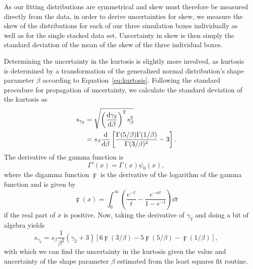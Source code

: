 As our fitting distributions are symmetrical and skew must therefore be measured directly from the data, in order to derive uncertainties for skew, we measure the skew of the distributions for each of our three simulation boxes individually as well as for the single stacked data set.  Uncertainty in skew is then simply the standard deviation of the mean of the skew of the three individual boxes.

Determining the uncertainty in the kurtosis is slightly more involved, as kurtosis is determined by a transformation of the generalized normal distribution's shape parameter $\beta$ according to Equation~\ref{eq:kurtosis}.  Following the standard procedure for propagation of uncertainty, we calculate the standard deviation of the kurtosis as
\begin{align} \label{eq:kurt_err_partial}
    s_{\gamma_{2}} &= \sqrt{ \left( \frac{{\rm {d}} \gamma_{2}}{{\rm {d}} \beta} \right)^{2} s_{\beta}^{2} } \\
        &= s_{\beta} \frac{{\rm {d}}}{{\rm {d}} \beta} \left[ \frac{\Gamma(5/\beta) \Gamma(1/\beta)}{\Gamma(3/\beta)^{2}} - 3 \right].
\end{align}
The derivative of the gamma function is
\begin{equation} \label{eq:gamma_prime}
    \Gamma'(x) = \Gamma(x) \psi_{0}(x),
\end{equation}
where the digamma function $\digamma$ is the derivative of the logarithm of the gamma function and is given by
\begin{equation} \label{eq:digamma}
    \digamma(x) = \int_{0}^{\infty} \left( \frac{e^{-t}}{t} - \frac{e^{-xt}}{1 - e^{-t}} \right) \dd t
\end{equation}
if the real part of $x$ is positive.  Now, taking the derivative of $\gamma_{2}$ and doing a bit of algebra yields
\begin{equation} \label{eq:kurt_err}
    s_{\gamma_{2}} = s_{\beta} \frac{1}{\beta^{2}} \left( \gamma_{2} + 3 \right) \left[ 6 \digamma(3/\beta) - 5 \digamma(5/\beta) - \digamma(1/\beta) \right],
\end{equation}
with which we can find the uncertainty in the kurtosis given the value and uncertainty of the shape parameter $\beta$ estimated from the least squares fit routine.

